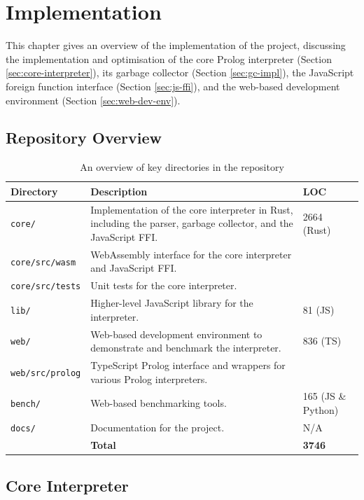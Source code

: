 \chapter{Implementation}

This chapter gives an overview of the implementation of the project, discussing the implementation and optimisation of the core Prolog interpreter (Section \ref{sec:core-interpreter}), its garbage collector (Section \ref{sec:gc-impl}), the JavaScript foreign function interface (Section \ref{sec:js-ffi}), and the web-based development environment (Section \ref{sec:web-dev-env}).

\section{Repository Overview}

\begin{table}[H]
\centering
\begin{tabular}{lp{9cm}l}
\hline
\textbf{Directory} & \textbf{Description} & \textbf{LOC} \\
\hline
\texttt{core/} & Implementation of the core interpreter in Rust, including the parser, garbage collector, and the JavaScript FFI. & 2664 (Rust) \\
\texttt{core/src/wasm} & WebAssembly interface for the core interpreter and JavaScript FFI. & \\
\texttt{core/src/tests} & Unit tests for the core interpreter. & \\
\texttt{lib/} & Higher-level JavaScript library for the interpreter. & 81 (JS) \\
\texttt{web/} & Web-based development environment to demonstrate and benchmark the interpreter. & 836 (TS) \\
\texttt{web/src/prolog} & TypeScript Prolog interface and wrappers for various Prolog interpreters. & \\
\texttt{bench/} & Web-based benchmarking tools. & 165 (JS \& Python) \\
\texttt{docs/} & Documentation for the project. & N/A \\
\hline
& \hfill \textbf{Total} & \textbf{3746} \\
\hline
\end{tabular}
\caption{An overview of key directories in the repository}
\label{tab:repository-overview}
\end{table}

\section{Core Interpreter}

